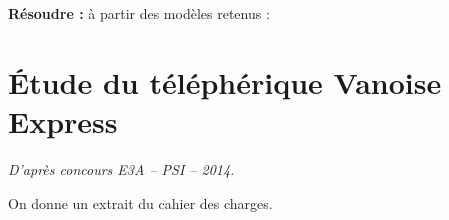\documentclass[10pt]{article}
\newif\ifprof
\begin{document}






\begin{comp}
\noindent \textbf{Résoudre :} à partir des modèles retenus :


\end{comp}

\section*{Étude du téléphérique Vanoise Express}

\begin{flushright}
\textit{D'après concours E3A -- PSI -- 2014.}
\end{flushright}




\begin{minipage}[c]{.7\linewidth}


\begin{obj} 


\end{obj}


 
\end{minipage} \hfill
\begin{minipage}[c]{.25\linewidth}
\begin{center}
\end{center}
\end{minipage}

\ifprof
\else
 On donne un extrait du cahier des charges.
\end{document}
